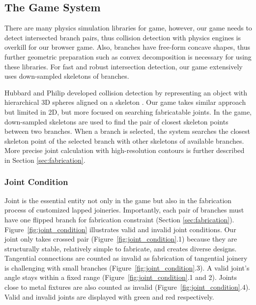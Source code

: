 \subsection{The Game System}
There are many physics simulation libraries for game, however, our game needs to detect intersected branch pairs, thus collision detection with physics engines is overkill for our browser game.
Also, branches have free-form concave shapes, thus further geometric preparation such as convex decomposition is necessary for using these libraries.
For fast and robust intersection detection, our game extensively uses down-sampled skeletons of branches.

Hubbard and Philip developed collision detection by representing an object with hierarchical 3D spheres aligned on a skeleton \cite{Hubbard:1996:APS:231731.231732}.
Our game takes similar approach but limited in 2D, but more focused on searching fabricatable joints.
In the game, down-sampled skeletons are used to find the pair of closest skeleton points between two branches.
When a branch is selected, the system searches the closest skeleton point of the selected branch with other skeletons of available branches.
More precise joint calculation with high-resolution contours is further described in Section \ref{sec:fabrication}.




\subsubsection{Joint Condition}
\label{sec:joint}
Joint is the essential entity not only in the game but also in the fabrication process of customized lapped joineries.
Importantly, each pair of branches must have one flipped branch for fabrication constraint (Section \ref{sec:fabrication}).
Figure~\ref{fig:joint_condition} illustrates valid and invalid joint conditions.
Our joint only takes crossed pair (Figure~\ref{fig:joint_condition}.1) because they are structurally stable, relatively simple to fabricate, and creates diverse designs.
Tangential connections are counted as invalid as fabrication of tangential joinery is challenging with small branches (Figure~\ref{fig:joint_condition}.3).
A valid joint's angle stays within a fixed range (Figure~\ref{fig:joint_condition}.1 and 2).
Joints close to metal fixtures are also counted as invalid (Figure~\ref{fig:joint_condition}.4).
Valid and invalid joints are displayed with green and red respectively.

